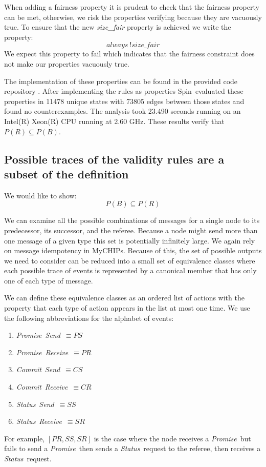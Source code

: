 \documentclass[runningheads]{llncs}
\newcommand{\send}{\emph{Send}}
\newcommand{\receive}{\emph{Receive}}
\newcommand{\promise}{\emph{Promise}}
\newcommand{\commit}{\emph{Commit}}
\newcommand{\status}{\emph{Status}}
\newcommand{\spin}{Spin}
\newcommand{\coderepository}{provided code repository \cite{Storey_Extending_Model_Checking_2023}}
\newif\ifcomments
\newif\ifkylecomments
\newcommand{\egm}[1]{\ifcomments\textcolor{orange}{egm: #1}\fi}
\newcommand{\krs}[1]{\ifkylecomments\textcolor{blue}{krs: #1}\fi}
\begin{document}
When adding a fairness property it is prudent to check that the fairness property can be met, otherwise, we risk the properties verifying because they are vacuously true. To ensure that the new \emph{size\_fair} property is achieved we write the property:
$$always\ !size\_fair$$
We expect this property to fail which indicates that the fairness constraint does not make our properties vacuously true. 

The implementation of these properties can be found in the \coderepository. After implementing the rules as properties \spin\ evaluated these properties in 11478 unique states with 73805 edges between those states and found no counterexamples. The analysis took 23.490 seconds running on an Intel(R) Xeon(R) CPU running at 2.60 GHz. These results verify that 
$P(R) \subseteq P(B)$.

\subsection{Possible traces of the validity rules are a subset of the definition}
\label{sec:outputs_bigger}
We would like to show:
$$P(B) \subseteq P(R)$$

We can examine all the possible combinations of messages for a single node to its predecessor, its successor, and the referee. Because a node might send more than one message of a given type this set is potentially infinitely large. We again rely on message idempotency in MyCHIPs. Because of this, the set of possible outputs we need to consider can be reduced into a small set of equivalence classes where each possible trace of events is represented by a canonical member that has only one of each type of message.

We can define these equivalence classes as an ordered list of actions with the property that each type of action appears in the list at most one time. 
We use the following abbreviations for the alphabet of events: 
\begin{enumerate}
    \item \promise\ \send\ $\equiv PS$ \krs{I created macros for most to use emph \egm{These need to be guarded with \emph{mathit}}}
    \item \promise\ \receive\ $\equiv PR$
    \item \commit\ \send\ $\equiv CS$
    \item \commit\ \receive\ $\equiv CR$
    \item \status\ \send\ $\equiv SS$
    \item \status\ \receive\ $\equiv SR$
\end{enumerate}
For example, $[PR, SS, SR]$ is the case where the node receives a \promise\ but fails to send a \promise\ then sends a \status\ request to the referee, then receives a \status\ request.
\end{document}
